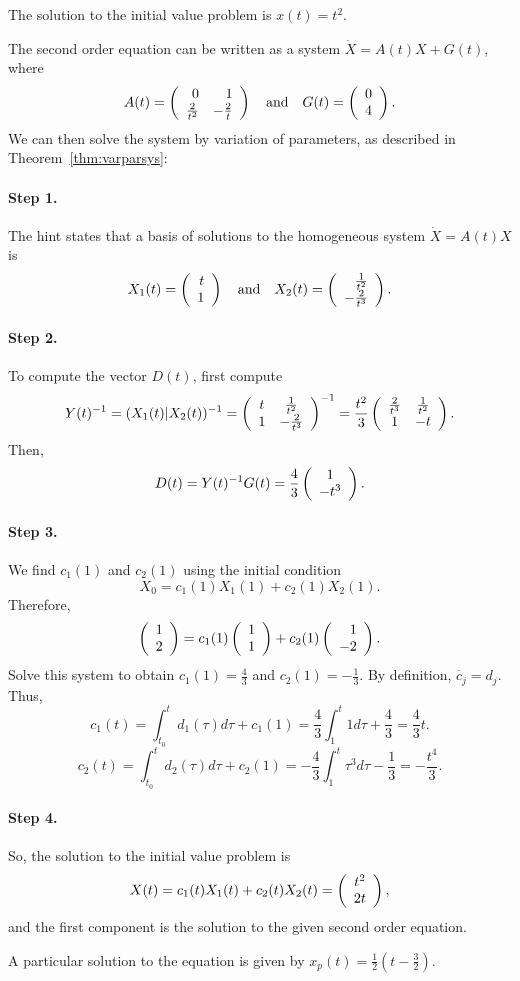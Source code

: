  \ans The solution to the initial value problem is
$x(t) = t^2$.

\soln The second order equation can be written as a system
$\dot{X} = A(t)X + G(t)$, where
\[
A(t) = \left(\begin{array}{rr} 0 & 1\\ \frac{2}{t^2} &-\frac{2}{t}\end{array}\right) \quad\mbox{and}\quad G(t) = \left(\begin{array}{c} 0 \\ 4\end{array}\right).
\]
We can then solve the system by variation of parameters, as described in
Theorem~\ref{thm:varparsys}:

\paragraph{Step 1.} The hint states that
a basis of solutions to the homogeneous system
$\dot{X} = A(t)X$ is
\[
X_1(t) = \left(\begin{array}{r} t \\ 1\end{array}\right) \quad\mbox{and}\quad X_2(t) = \left(\begin{array}{r} \frac{1}{t^2} \\ -\frac{2}{t^3}\end{array}\right).
\]
\paragraph{Step 2.} To compute the vector $D(t)$, first compute
\[
Y(t)^{-1} = (X_1(t)|X_2(t))^{-1} =
\left(\begin{array}{cc} t & \frac{1}{t^2}\\ 1 &-\frac{2}{t^3}\end{array}\right)^{-1} =
\frac{t^2}{3}\left(\begin{array}{cc} \frac{2}{t^3} & \frac{1}{t^2}\\ 1 &-t\end{array}\right).
\]
Then,
\[
D(t) = Y(t)^{-1}G(t) = \frac{4}{3}\left(\begin{array}{c} 1 \\ -t^3\end{array}\right).
\]
\paragraph{Step 3.} We find $c_1(1)$ and $c_2(1)$ using the initial
condition
\[
X_0 = c_1(1)X_1(1) + c_2(1)X_2(1).
\]
Therefore,
\[
\left(\begin{array}{r} 1 \\ 2\end{array}\right) = c_1(1)\left(\begin{array}{r} 1 \\ 1\end{array}\right) + c_2(1)\left(\begin{array}{r} 1 \\ -2\end{array}\right).
\]
Solve this system to obtain $c_1(1) = \frac{4}{3}$ and $c_2(1) = -\frac{1}{3}$.
By definition,
$\dot{c_j} = d_j$.  Thus,
\[
c_1(t) = \int_{t_0}^td_1(\tau)d\tau + c_1(1)
= \frac{4}{3}\int_{1}^t 1 d\tau + \frac{4}{3} = \frac{4}{3}t.
\]
\[
c_2(t) = \int_{t_0}^td_2(\tau)d\tau + c_2(1)
= -\frac{4}{3}\int_{1}^t\tau^3 d\tau - \frac{1}{3}= -\frac{t^4}{3}.
\]
\paragraph{Step 4.} So, the solution to the initial value problem is
\[
X(t) = c_1(t)X_1(t) + c_2(t)X_2(t) = \left(\begin{array}{c} t^2 \\ 2t\end{array}\right),
\]
and the first component is the solution to the given second order
equation.

 \ans A particular solution to the equation is given by
$x_p(t) = \frac{1}{2}(t-\frac{3}{2})$.

